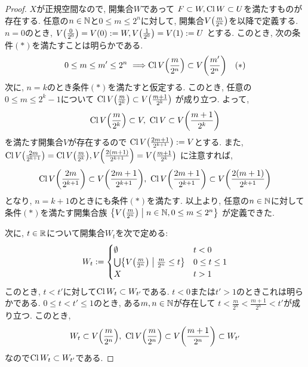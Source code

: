 \documentclass[uplatex, dvipdfmx, a4paper, 12pt, class=jsbook, crop=false]{standalone}
\begin{document}
\begin{proof}
	\( X \)が正規空間なので, 開集合\( W \)であって
	\( F \subset W, \mathop{\mathrm{Cl}}\nolimits W \subset U \)を満たすものが存在する.
	任意の\( n \in \mathbb{N} \)と\( 0 \leq m \leq 2^n \)に対して,
	開集合\( V\lrparen{{\frac{m}{2^n}}} \)を以降で定義する.
	\( n = 0 \)のとき,
	\( V\lrparen{{\frac{0}{2^0}}}
	= V\lrparen{0}
	\defeq W,
	V\lrparen{{\frac{1}{2^0}}}
	= V\lrparen{1}
	\defeq U \)
	とする.
	このとき, 次の条件\( (\ast) \)を満たすことは明らかである.
	\[ 0 \leq m \leq m' \leq 2^n \ \Longrightarrow
	\topcl V\lrparen{\frac{m}{2^n}} \subset V\lrparen{\frac{m'}{2^n}} \ \ \ (\ast) \]
	次に, \( n = k \)のとき条件\( (\ast) \)を満たすと仮定する.
	このとき, 任意の\( 0 \leq m \leq 2^k - 1 \)について
	\( \topcl V\lrparen{\frac{m}{2^k}} \subset V\lrparen{\frac{m+1}{2^k}} \)
	が成り立つ.
	よって,
	\[ \topcl V\lrparen{\frac{m}{2^k}} \subset V, \
	\topcl V \subset V\lrparen{\frac{m+1}{2^k}} \]
	を満たす開集合$ V $が存在するので
	\( \topcl V\lrparen{\frac{2m+1}{2^{k+1}}} \defeq V \)とする.
	また, \( \topcl V\lrparen{\frac{2m}{2^{k+1}}}
	= \topcl V\lrparen{\frac{m}{2^k}},
	V\lrparen{\frac{2(m+1)}{2^{k+1}}} = V\lrparen{\frac{m+1}{2^k}} \)
	に注意すれば,
	\[ \topcl V\lrparen{\frac{2m}{2^{k+1}}} \subset V\lrparen{\frac{2m+1}{2^{k+1}}}, \
	\topcl V\lrparen{\frac{2m+1}{2^{k+1}}} \subset V\lrparen{\frac{2(m+1)}{2^{k+1}}} \]
	となり, \( n = k+1 \)のときにも条件\( (\ast) \)を満たす.
	以上より, 任意の\( n \in \mathbb{N} \)に対して
	条件\( (\ast) \)を満たす開集合族
	\( \setcomp{V\lrparen{\frac{m}{2^n}}}
	{n \in \N, 0 \leq m \leq 2^n} \)
	が定義できた.

	次に, \( t \in \mathbb{R} \)について開集合\( W_t \)を次で定める:
	\[ W_t \defeq \begin{cases}
		\emptyset & t < 0 \\
		\bigcup \setcomp{V\lrparen{\frac{m}{2^n}}}{\frac{m}{2^n} \leq t} & 0 \leq t \leq 1 \\
		X & t > 1
	\end{cases}\]
	このとき, \( t < t' \)に対して\( \mathop{\mathrm{Cl}}\nolimits W_t \subset W_{t'} \)である.
	\( t < 0 \)または\( t' > 1 \)のときこれは明らかである.
	\( 0 \leq t < t' \leq 1 \)のとき,
	ある\( m, n \in \mathbb{N} \)が存在して
	\( t < \frac{m}{2^n} < \frac{m+1}{2^n} < t' \)が成り立つ.
	このとき, \[ W_t \subset V\lrparen{\frac{m}{2^n}}, \
	\topcl V\lrparen{\frac{m}{2^n}} \subset V\lrparen{\frac{m+1}{2^n}} \subset W_{t'} \]
	なので\( \mathop{\mathrm{Cl}}\nolimits W_t \subset W_{t'} \)である.


\end{proof}
\end{document}
